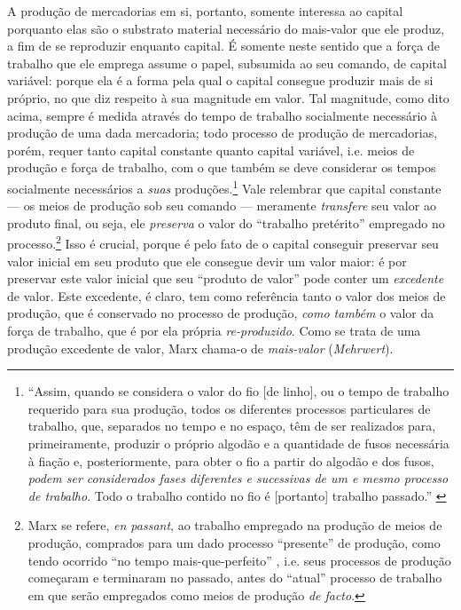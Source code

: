 A produção de mercadorias em si, portanto, somente interessa ao capital porquanto elas são o substrato material necessário do mais-valor que ele produz, a fim de se reproduzir enquanto capital. É somente neste sentido que a força de trabalho que ele emprega assume o papel, subsumida ao seu comando, de capital variável: porque ela é a forma pela qual o capital consegue produzir mais de si próprio, no que diz respeito à sua magnitude em valor. Tal magnitude, como dito acima, sempre é medida através do tempo de trabalho socialmente necessário à produção de uma dada mercadoria; todo processo de produção de mercadorias, porém, requer tanto capital constante quanto capital variável, i.e. meios de produção e força de trabalho, com o que também se deve considerar os tempos socialmente necessários a \textit{suas} produções.\footnote{``Assim, quando se considera o valor do fio [de linho], ou o tempo de trabalho requerido para sua produção, todos os diferentes processos particulares de trabalho, que, separados no tempo e no espaço, têm de ser realizados para, primeiramente, produzir o próprio algodão e a quantidade de fusos necessária à fiação e, posteriormente, para obter o fio a partir do algodão e dos fusos, \textit{podem ser considerados fases diferentes e sucessivas de um e mesmo processo de trabalho}. Todo o trabalho contido no fio é [portanto] trabalho passado.'' \parencite[p. 264-5, grifo meu]{Marx2017}} Vale relembrar que capital constante --- os meios de produção sob seu comando --- meramente \textit{transfere} seu valor ao produto final, ou seja, ele \textit{preserva} o valor do ``trabalho pretérito'' empregado no processo.\footnote{Marx se refere, \textit{en passant}, ao trabalho empregado na produção de meios de produção, comprados para um dado processo ``presente'' de produção, como tendo ocorrido ``no tempo mais-que-perfeito'' \parencite[p. 265]{Marx2017}, i.e. seus processos de produção começaram e terminaram no passado, antes do ``atual'' processo de trabalho em que serão empregados como meios de produção \textit{de facto}.} Isso é crucial, porque é pelo fato de o capital conseguir preservar seu valor inicial em seu produto que ele consegue devir um valor maior: é por preservar este valor inicial que seu ``produto de valor'' pode conter um \textit{excedente} de valor. Este excedente, é claro, tem como referência tanto o valor dos meios de produção, que é conservado no processo de produção, \textit{como também} o valor da força de trabalho, que é por ela própria \textit{re-produzido}. Como se trata de uma produção excedente de valor, Marx chama-o de \textit{mais-valor} (\textit{Mehrwert}).

